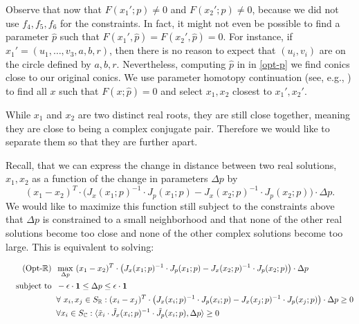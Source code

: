 \documentclass[12pt]{amsart}
\theoremstyle{definition}
\theoremstyle{definition}
\numberwithin{equation}{section}
\newcommand{\RR}{\mathbb{R}}
\newcommand{\CC}{\mathbb{C}}
\begin{document}
Observe that now that $F(x_{1}';p)\neq0$ and $F(x_{2}';p)\neq0$, because we did not use $f_4,f_5,f_6$ for the constraints. In fact, it might not even be possible to find a parameter $\hat{p}$ such that $F(x_1',\hat p)=F(x_2',\hat p)=0$. For instance, if $x_1'=(u_1,\ldots,v_3,a,b,r)$, then there is no reason to expect that $(u_i,v_i)$ are on the circle defined by $a,b,r$. Nevertheless, computing $\hat p$ in in \eqref{opt-p} we find conics close to our original conics. We use parameter homotopy continuation (see, e.g., \cite[Section 7]{Sommese:Wampler:2005}) to find all $x$ such that $F(x; \hat{p}) = 0$ and select $x_1,x_2$ closest to $x_1',x_2'$.

While $x_{1}$ and $x_{2}$ are two distinct real roots, they are still close together, meaning they are close to being a complex conjugate pair. Therefore we would like to separate them so that they are further apart. 

Recall, that we can express the change in distance between two real solutions, $x_1,x_2$ as a function of the change in parameters $\Delta p$ by
\[ (x_1 - x_2)^T \cdot \big( J_x(x_1;p)^{-1} \cdot J_p(x_1;p) - J_x(x_2;p)^{-1} \cdot J_p(x_2;p) \big) \cdot \Delta p. \]
We would like to maximize this function still subject to the constraints above that $\Delta p$ is constrained to a small neighborhood and that none of the other real solutions become too close and none of the other complex solutions become too large. This is equivalent to solving:


\footnotesize
\begin{align*}
    \label{opt-R}\tag{Opt-$\RR$} &\hspace{0.2cm} \max_{\Delta p} \  (x_1 - x_2)^T \cdot \big( J_x(x_1;p)^{-1} \cdot J_p(x_1;p) - J_x(x_2;p)^{-1} \cdot J_p(x_2;p) \big) \cdot \Delta p  \\
    \text{subject to} & \hspace{0.2cm}- \epsilon \cdot \mathbf{1} \leq \Delta p \leq \epsilon \cdot \mathbf{1} \\
    &\hspace{0.2cm} \forall \ x_i, x_j \in S_{\RR}: (x_i - x_j)^T \cdot \big( J_x(x_i;p)^{-1} \cdot J_p(x_i;p) - J_x(x_j;p)^{-1} \cdot J_p(x_j;p) \big) \cdot \Delta p \geq 0  \\
    &\hspace{0.2cm} \forall x_i \in S_{\CC}: \langle \Tilde{x}_i \cdot \Tilde{J}_x(x_i;p)^{-1} \cdot \Tilde{J}_p(x_i;p), \Delta p \rangle \geq 0
\end{align*}
\normalsize
\end{document}
